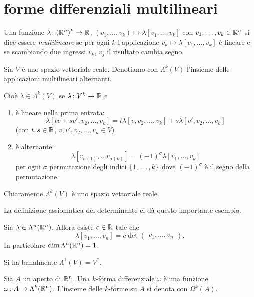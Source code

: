 \section{forme differenziali multilineari}

Una funzione $\lambda\colon ({\mathbb R}^n)^k\to {\mathbb R}$, 
$(v_1,\dots, v_k)\mapsto \lambda[v_1,\dots, v_k]$
con $v_1,\dots, v_k \in {\mathbb R}^n$
si dice essere \emph{multilineare} se per ogni $k$ 
l'applicazione $v_k \mapsto \lambda[v_1,\dots, v_k]$ 
è lineare e se scambiando due ingressi $v_k$, $v_j$ 
il risultato cambia segno.

\begin{definition}
Sia $V$ è uno spazio vettoriale reale.
Denotiamo con $\Lambda^k(V)$
l'insieme delle applicazioni multilineari alternanti.

Cioè $\lambda \in \Lambda^k(V)$ se 
$\lambda\colon V^k\to {\mathbb R}$ e
\begin{enumerate}
\item è lineare nella prima entrata:
\[
    \lambda[tv + s v', v_2, \dots, v_k] 
    = t\lambda[v,v_2,\dots,v_k]
    + s \lambda[v',v_2,\dots, v_k]
\]
(con $t,s\in {\mathbb R}$, $v,v',v_2,\dots, v_n\in V$)
\item è alternante:
\[
    \lambda[v_{\sigma(1)}, \dots v_{\sigma(k)}] = 
    (-1)^\sigma \lambda[v_1,\dots, v_k]
    \]
per ogni $\sigma$ permutazione degli indici ${\left\{ 1,\dots,k \right\}}$
dove $(-1)^\sigma$ è il segno della permutazione.
\end{enumerate}
Chiaramente $\Lambda^k(V)$ è uno spazio vettoriale reale.
\end{definition}

La definizione assiomatica del determinante 
ci dà questo importante esempio.
\begin{example}
Sia $\lambda\in \Lambda^n({\mathbb R}^n)$. 
Allora esiste $c\in {\mathbb R}$ tale che 
\[ 
    \lambda[v_1, \dots, v_n] = c \det \begin{pmatrix}
    v_1, \dots, v_n
    \end{pmatrix}.
\]
In particolare $\dim \Lambda^n({\mathbb R}^n) = 1$.
\end{example}

\begin{remark}
Si ha banalmente $\Lambda^1(V) = V^*$.
\end{remark}

\begin{definition}
Sia $A$ un aperto di ${\mathbb R}^n$.
Una $k$-forma differenziale $\omega$ è una funzione 
$\omega\colon A \to \Lambda^k({\mathbb R}^n)$.
L'insieme delle $k$-forme su $A$ si denota con $\Omega^k(A)$.
\end{definition}

